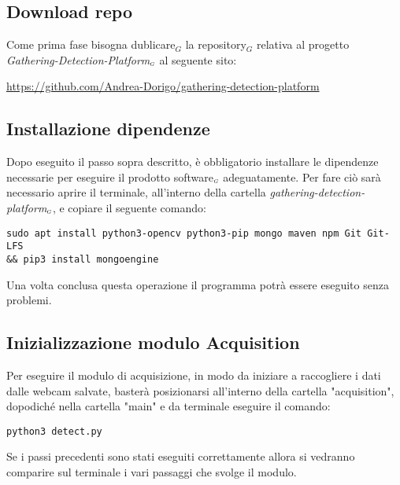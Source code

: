 \subsection{Download repo}\label{RequisitiDiSistemaEdInstallazioneInstallazioneDownloadRepo}
Come prima fase bisogna dublicare$_G$ la repository$_G$ relativa al progetto \textit{Gathering-Detection-Platform$_{\scaleto{G}{3pt}}$} al seguente sito:
\begin{center}
	\item \url{https://github.com/Andrea-Dorigo/gathering-detection-platform}
\end{center}

\subsection{Installazione dipendenze}\label{RequisitiDiSistemaEdInstallazioneInstallazioneInstallazioneDipendenze}
Dopo eseguito il passo sopra descritto, è obbligatorio installare le dipendenze necessarie per eseguire il prodotto software$_{\scaleto{G}{3pt}}$ adeguatamente.
Per fare ciò sarà necessario aprire il terminale, all'interno della cartella \textit{gathering-detection-platform$_{\scaleto{G}{3pt}}$}, e copiare il seguente comando:
\begin{lstlisting}
sudo apt install python3-opencv python3-pip mongo maven npm Git Git-LFS 
&& pip3 install mongoengine
\end{lstlisting}

Una volta conclusa questa operazione il programma potrà essere eseguito senza problemi.

\subsection{Inizializzazione modulo Acquisition}\label{RequisitiDiSistemaEdInstallazioneInstallazioneInizializzazioneModuloAcquisition}
Per eseguire il modulo di acquisizione, in modo da iniziare a raccogliere i dati dalle webcam salvate, basterà posizionarsi all'interno della cartella "acquisition", dopodiché nella cartella "main" e da terminale eseguire il comando:
\begin{lstlisting}
python3 detect.py
\end{lstlisting}
Se i passi precedenti sono stati eseguiti correttamente allora si vedranno comparire sul terminale i vari passaggi che svolge il modulo.



